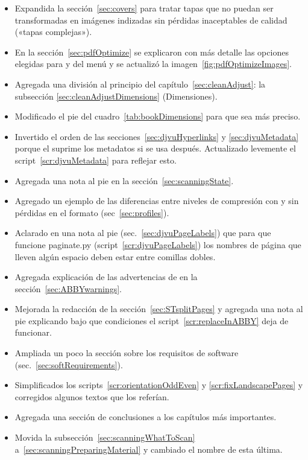 \documentclass[%
	a5paper,
	10pt,
	twoside,
	openright,
	final,
]{memoir}
\begin{document}
\begin{itemize}
\begin{itemize}
				\item Expandida la sección~\ref{sec:covers} para tratar tapas que no puedan ser transformadas en imágenes indizadas sin pérdidas inaceptables de calidad («tapas complejas»).
				\item En la sección~\ref{sec:pdfOptimize} se explicaron con más detalle las opciones elegidas para  y  del menú  y se actualizó la imagen~\ref{fig:pdfOptimizeImages}.
				\item Agregada una división al principio del capítulo~\ref{sec:cleanAdjust}: la subsección \ref{sec:cleanAdjustDimensions} (Dimensiones).
				\item Modificado el pie del cuadro~\ref{tab:bookDimensions} para que sea más preciso.
				\item Invertido el orden de las secciones~\ref{sec:djvuHyperlinks} y \ref{sec:djvuMetadata} porque el \djvueditor suprime los metadatos si se usa después. Actualizado levemente el script~\ref{scr:djvuMetadata} para reflejar esto.
				\item Agregada una nota al pie en la sección~\ref{sec:scanningState}.
				\item Agregado un ejemplo de las diferencias entre niveles de compresión con y sin pérdidas en el formato \djvu (sec~\ref{sec:profiles}).
				\item Aclarado en una nota al pie (sec.~\ref{sec:djvuPageLabels}) que para que funcione paginate.py (script~\ref{scr:djvuPageLabels}) los nombres de página que lleven algún espacio deben estar entre comillas dobles.
				\item Agregada explicación de las advertencias de \abby en la sección~\ref{sec:ABBYwarnings}.
				\item Mejorada la redacción de la sección~\ref{sec:STsplitPages} y agregada una nota al pie explicando bajo que condiciones el script~\ref{scr:replaceInABBY} deja de funcionar.
				\item Ampliada un poco la sección sobre los requisitos de software (sec.~\ref{sec:softRequirements}).
				\item Simplificados los scripts~\ref{scr:orientationOddEven} y \ref{scr:fixLandscapePages} y corregidos algunos textos que los referían.
				\item Agregada una sección de conclusiones a los capítulos más importantes.
				\item Movida la subsección~\ref{sec:scanningWhatToScan} a~\ref{sec:scanningPreparingMaterial} y cambiado el nombre de esta última.

\end{itemize}
\end{itemize}
\end{document}
